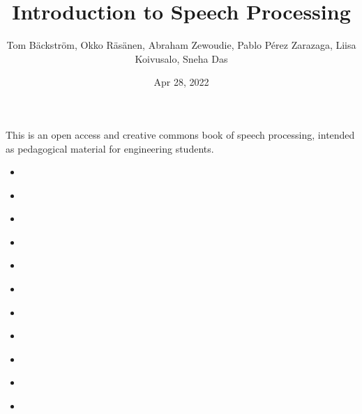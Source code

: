\documentclass[letterpaper,10pt,english]{jupyterBook}
\title{Introduction to Speech Processing}
\date{Apr 28, 2022}
\author{Tom Bäckström, Okko Räsänen, Abraham Zewoudie, Pablo Pérez Zarazaga, Liisa Koivusalo, Sneha Das}
\begin{document}
\pagestyle{empty}
\sphinxmaketitle
\pagestyle{plain}
\sphinxtableofcontents
\pagestyle{normal}
\label{\detokenize{index::doc}}


\sphinxAtStartPar
{}

\sphinxAtStartPar
This is an open access and creative commons book of speech processing, intended as pedagogical material for engineering students.
\begin{itemize}
\item {} 
\sphinxAtStartPar
{\hyperref[\detokenize{Preface::doc}]{}}

\item {} 
\sphinxAtStartPar
{\hyperref[\detokenize{Introduction::doc}]{}}

\item {} 
\sphinxAtStartPar
{\hyperref[\detokenize{Representations/Representations::doc}]{}}

\item {} 
\sphinxAtStartPar
{\hyperref[\detokenize{Pre-processing::doc}]{}}

\item {} 
\sphinxAtStartPar
{\hyperref[\detokenize{Modelling_tools_in_speech_processing::doc}]{}}

\item {} 
\sphinxAtStartPar
{\hyperref[\detokenize{Evaluation_of_speech_processing_methods::doc}]{}}

\item {} 
\sphinxAtStartPar
{\hyperref[\detokenize{Speech_analysis::doc}]{}}

\item {} 
\sphinxAtStartPar
{\hyperref[\detokenize{Recognition_tasks_in_speech_processing::doc}]{}}

\item {} 
\sphinxAtStartPar
{\hyperref[\detokenize{Speech_Synthesis::doc}]{}}

\item {} 
\sphinxAtStartPar
{\hyperref[\detokenize{Transmission_storage_and_telecommunication::doc}]{}}

\item {} 
\sphinxAtStartPar
{\hyperref[\detokenize{Speech_enhancement::doc}]{}}


\end{itemize}
\end{document}
